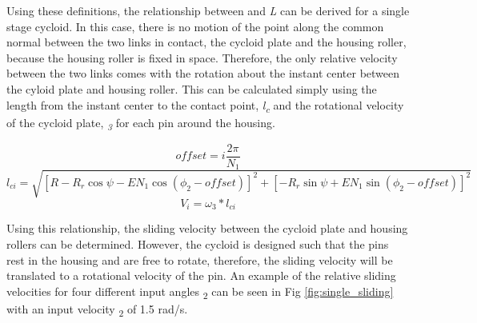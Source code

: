 Using these definitions, the relationship between  and \textit{L} can be derived for a single stage cycloid. In this case, there is no motion of the point along the common normal between the two links in contact, the cycloid plate and the housing roller, because the housing roller is fixed in space. Therefore, the only relative velocity between the two links comes with the rotation about the instant center between the cyloid plate and housing roller. This can be calculated simply using the length from the instant center to the contact point, \textit{l\textsubscript{c}} and the rotational velocity of the cycloid plate, \textit{\textomega\textsubscript{3}} for each pin around the housing. 

\begin{equation} \label{eq:single_slide_offset}
offset = i \frac{2\pi}{N_1}
\end{equation}
\begin{equation} \label{eq:single_slide_length}
l_{ci} = \sqrt{\left[R-R_r\cos\psi - E N_1 \cos(\phi_2 - offset)\right]^2 
+ \left[-R_r \sin{\psi} + E N_1 \sin(\phi_2 - offset)\right]^2 }
\end{equation}
\begin{equation} \label{eq:single_slide_vel}
V_i = \omega_3 * l_{ci}
\end{equation}

Using this relationship, the sliding velocity between the cycloid plate and housing rollers can be determined. However, the cycloid is designed such that the pins rest in the housing and are free to rotate, therefore, the sliding velocity will be translated to a rotational velocity of the pin. An example of the relative sliding velocities for four different input angles \textphi\textsubscript{2} can be seen in Fig \ref{fig:single_sliding} with an input velocity \textomege\textsubscript{2} of 1.5 rad/s.

